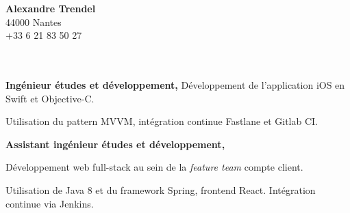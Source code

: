 \documentclass{cv}
\begin{document}
\pagestyle{empty}

\begin{minipage}[c]{0.6\textwidth}
\end{minipage}
\begin{minipage}[c]{0.4\textwidth}

\textbf{\large Alexandre Trendel} \\
44000 Nantes \\
 +33 6 21 83 50 27 \\
 \href{mailto:${INFO_EMAIL}}{} \\
 \href{https://github.com/xou816}{} \\

\end{minipage}

\vspace{1cm}


\begin{mainexpbox}[title=nov. 2019 -- aujourd'hui]

	\begin{minipage}[c]{20mm}
	\end{minipage}
	\begin{minipage}[c]{0.8\textwidth}

	\textbf{Ingénieur études et développement, \evtech{}} \newline
	Développement de l'application iOS \href{https://apps.apple.com/fr/app/oui-sncf-train-et-bus/id343889987}{} en Swift et Objective-C. 

	Utilisation du pattern MVVM, intégration continue Fastlane et Gitlab CI.
	\end{minipage}

\end{mainexpbox}

\begin{expbox}[title={déc. 2016, \faicon{clock-o} 3 ans}]

	\begin{minipage}[c]{20mm}
	\end{minipage}
	\begin{minipage}[c]{0.8\textwidth}

	\textbf{Assistant ingénieur études et développement, \evtech{}}

	Développement web full-stack au sein de la \textit{feature team} compte client.

	Utilisation de Java 8 et du framework Spring, frontend React. Intégration continue via Jenkins.
	\end{minipage}

\end{expbox}
\end{document}
